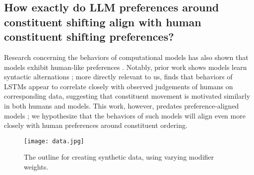 \subsection{How exactly do LLM preferences around constituent shifting align with human constituent shifting preferences?}

Research concerning the behaviors of computational models has also shown that models exhibit human-like preferences \cite{Fujihara2022TopicalizationIL, linzen2016assessingabilitylstmslearn, marvin-linzen-2018-targeted, 10.1162/kamath2024}.
Notably, prior work shows models learn syntactic alternations \cite{wilcox2019syntacticstructuresblockdependencies, lau2017}; more directly relevant to us, \citet{futrell2018rnnslearnhumanlikeabstract} finds that behaviors of LSTMs appear to correlate closely with observed judgements of humans on corresponding data, suggesting that constituent movement is motivated similarly in both humans and models. This work, however, predates preference-aligned models \cite{ouyang2022traininglanguagemodelsfollow}; we hypothesize that the behaviors of such models will align even more closely with human preferences around constituent ordering.

\begin{figure*}
    \centering
    \texttt{[image: data.jpg]}
    \caption{The outline for creating synthetic data, using varying modifier weights.}
    \label{fig:DFig}
\end{figure*}